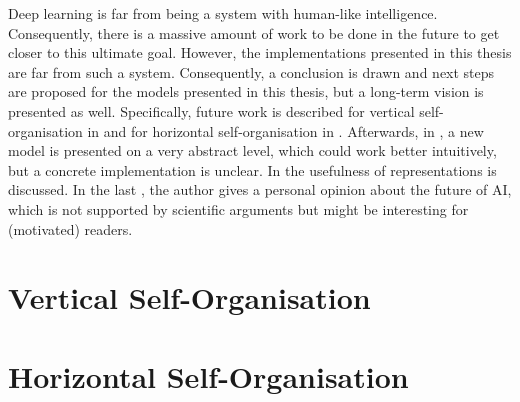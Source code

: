 
Deep learning is far from being a system with human-like intelligence. Consequently, there is a massive amount of work to be done in the future to get closer to this ultimate goal. However, the implementations presented in this thesis are far from such a system. Consequently, a conclusion is drawn and next steps are proposed for the models presented in this thesis, but a long-term vision is presented as well. Specifically, future work is described for vertical self-organisation in  and for horizontal self-organisation in . Afterwards, in , a new model is presented on a very abstract level, which could work better intuitively, but a concrete implementation is unclear. In  the usefulness of representations is discussed. In the last , the author gives a personal opinion about the future of AI, which is not supported by scientific arguments but might be interesting for (motivated) readers.


\section{Vertical Self-Organisation}


\section{Horizontal Self-Organisation}




